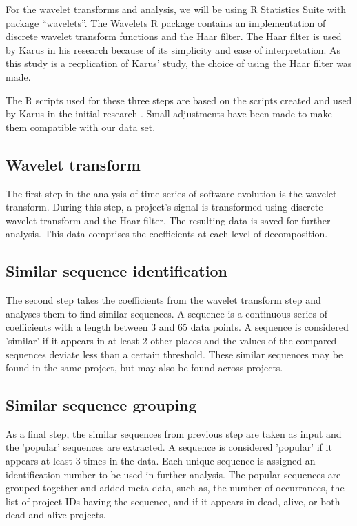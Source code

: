 For the wavelet transforms and analysis, we will be using R Statistics Suite
with package ``wavelets''. The Wavelets R package contains an implementation of
discrete wavelet transform functions and the Haar filter. The Haar filter is
used by Karus in his research \cite{karus2013} because of its simplicity and
ease of interpretation. As this study is a recplication of Karus' study, the
choice of using the Haar filter was made.

The R scripts used for these three steps are based on the scripts created and
used by Karus in the initial research \cite{karus2013}. Small adjustments have
been made to make them compatible with our data set.

\subsection{Wavelet transform}
The first step in the analysis of time series of software evolution is the
wavelet transform. During this step, a project's signal is transformed using
discrete wavelet transform and the Haar filter. The resulting data is saved for
further analysis. This data comprises the coefficients at each level of
decomposition.

\subsection{Similar sequence identification}
The second step takes the coefficients from the wavelet transform step and
analyses them to find similar sequences. A sequence is a continuous series of
coefficients with a length between 3 and 65 data points. A sequence is
considered 'similar' if it appears in at least 2 other places and the
values of the compared sequences deviate less than a certain threshold. These
similar sequences may be found in the same project, but may also be found
across projects.

\subsection{Similar sequence grouping}
As a final step, the similar sequences from previous step are taken as input and
the 'popular' sequences are extracted. A sequence is considered 'popular' if it
appears at least 3 times in the data. Each unique sequence is assigned an
identification number to be used in further analysis. The popular sequences are
grouped together and added meta data, such as, the number of occurrances, the
list of project IDs having the sequence, and if it appears in dead, alive, or
both dead and alive projects.


